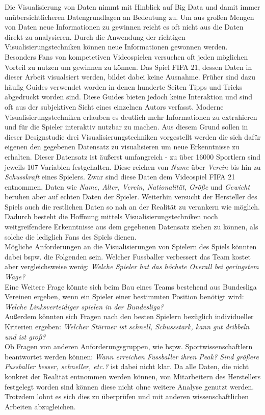 \documentclass[usegeometry=true]{scrartcl}
\begin{document}
Die Visualisierung von Daten nimmt mit Hinblick auf Big Data und damit immer unübersichtlicheren Datengrundlagen an Bedeutung zu. Um aus großen Mengen von Daten neue Informationen zu gewinnen reicht es oft nicht aus die Daten direkt zu analysieren. Durch die Anwendung der richtigen Visualisierungstechniken können neue Informationen gewonnen werden.\\
Besonders Fans von kompetetiven Videospielen versuchen oft jeden möglichen Vorteil zu nutzen um gewinnen zu können.
Das Spiel FIFA 21, dessen Daten in dieser Arbeit visualsiert werden, bildet dabei keine Ausnahme.
Früher sind dazu häufig Guides verwendet worden in denen hunderte Seiten Tipps und Tricks abgedruckt worden sind. Diese Guides bieten jedoch keine Interaktion und sind oft aus der subjektiven Sicht eines einzelnen Autors verfasst. 
Moderne Visualisierungstechniken erlauben es deutlich mehr Informationen zu extrahieren und für die Spieler interaktiv nutzbar zu machen.
Aus diesem Grund sollen in dieser Designstudie drei Visualisierungstechniken vorgestellt werden die sich dafür eigenen den gegebenen Datensatz zu visualisieren um neue Erkenntnisse zu erhalten.
Dieser Datensatz ist äußerst umfangreich - zu über 16000 Sportlern sind jeweils 107 Variablen festgehalten. Diese reichen von \textit{Name} über \textit{Verein} bis hin zu \textit{Schusskraft} eines Spielers.
Zwar sind diese Daten dem Videospiel FIFA 21 entnommen, Daten wie \textit{Name, Alter, Verein, Nationalität, Größe} und \textit{Gewicht} beruhen aber auf echten Daten der Spieler. Weiterhin versucht der Hersteller des Spiels auch die restlichen Daten so nah an der Realität zu verankern wie möglich.
Dadurch besteht die Hoffnung mittels Visualisierungstechniken noch weitgreifendere Erkenntnisse aus dem gegebenen Datensatz ziehen zu können, als solche die lediglich Fans des Spiels dienen.\\
Mögliche Anforderungen an die Visualisierungen von Spielern des Spiels könnten dabei bspw. die Folgenden sein. Welcher Fussballer verbessert das Team kostet aber vergleichsweise wenig: \textit{Welche Spieler hat das höchste Overall bei geringstem Wage?}\\
Eine Weitere Frage könnte sich beim Bau eines Teams bestehend aus Bundesliga Vereinen ergeben, wenn ein Spieler einer bestimmten Position benötigt wird: \textit{Welche Linksverteidiger spielen in der Bundesliga?}\\
Außerdem könnten sich Fragen nach den besten Spielern bezüglich individueller Kriterien ergeben: \textit{Welcher Stürmer ist schnell, Schussstark, kann gut dribbeln und ist groß?}\\
Ob Fragen von anderen Anforderungsgruppen, wie bspw. Sportwissenschaftlern beantwortet werden können: \textit{Wann erreichen Fussballer ihren Peak? Sind größere Fussballer besser, schneller, etc.?} ist dabei nicht klar. Da alle Daten, die nicht konkret der Realität entnommen werden können, von Mitarbeitern des Herstellers festgelegt worden sind können diese nicht ohne weitere Analyse genutzt werden. Trotzdem lohnt es sich dies zu überprüfen und mit anderen wissenschaftlichen Arbeiten abzugleichen.
\end{document}
